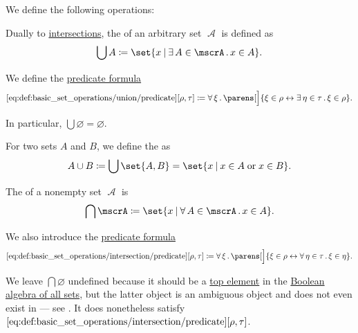 \begin{definition}\label{def:basic_set_operations}
  We define the following operations:

  \begin{thmenum}
     Dually to \hyperref[def:basic_set_operations/intersection]{intersections}, the  of an arbitrary set \( \mscrA \) is defined as
    \begin{equation*}
      \bigcup A \coloneqq \set{ x \given \qexists {A \in \mscrA} x \in A }.
    \end{equation*}

    We define the \hyperref[rem:predicate_formula]{predicate formula}
    \begin{equation*}\taglabel[\op{IsUnion}]{eq:def:basic_set_operations/union/predicate}
      \ref{eq:def:basic_set_operations/union/predicate}[\rho, \tau] \coloneqq \qforall \xi \parens[\Big]{ \xi \in \rho \leftrightarrow \qexists {\eta \in \tau} \xi \in \rho }.
    \end{equation*}

    In particular, \( \bigcup \varnothing = \varnothing \).

    For two sets \( A \) and \( B \), we define the  as
    \begin{equation*}
      A \cup B \coloneqq \bigcup \set{ A, B } = \set{ x \given x \in A \T{or} x \in B }.
    \end{equation*}

     The  of a nonempty set \( \mscrA \) is
    \begin{equation*}
      \bigcap \mscrA \coloneqq \set{ x \given \qforall {A \in \mscrA} x \in A }.
    \end{equation*}

    We also introduce the \hyperref[rem:predicate_formula]{predicate formula}
    \begin{equation*}\taglabel[\op{IsIntersection}]{eq:def:basic_set_operations/intersection/predicate}
      \ref{eq:def:basic_set_operations/intersection/predicate}[\rho, \tau] \coloneqq \qforall \xi \parens[\Big]{ \xi \in \rho \leftrightarrow \qforall {\eta \in \tau} \xi \in \eta }.
    \end{equation*}

    We leave \( \bigcap \varnothing \) undefined because it should be a \hyperref[def:partially_ordered_set_extremal_points/top_and_bottom]{top element} in the \hyperref[thm:boolean_algebra_of_subsets]{Boolean algebra of all sets}, but the latter object is an ambiguous object and does not even exist in  --- see . It does nonetheless satisfy \( \ref{eq:def:basic_set_operations/intersection/predicate}[\rho, \tau] \).


\end{thmenum}
\end{definition}
